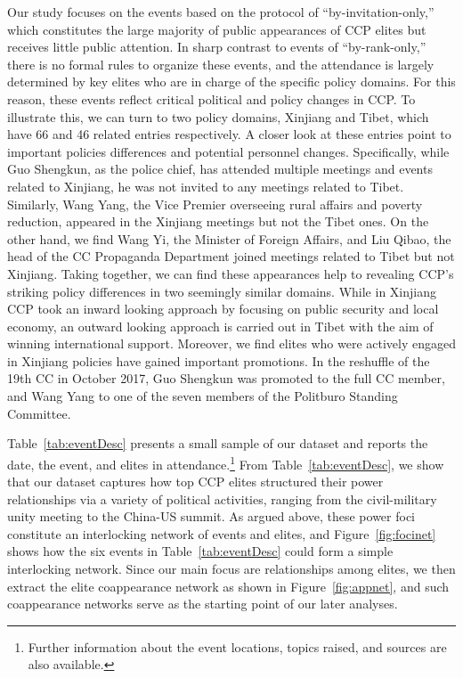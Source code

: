 \documentclass[11pt,english]{article}
\begin{document}
\begin{flushleft}
Our study focuses on the events based on the protocol of “by-invitation-only,” which constitutes the large majority of public appearances of CCP elites but receives little public attention.  In sharp contrast to events of “by-rank-only,” there is no formal rules to organize these events, and the attendance is largely determined by key elites who are in charge of the specific policy domains.  For this reason, these events reflect critical political and policy changes in CCP.  To illustrate this, we can turn to two policy domains, Xinjiang and Tibet, which have 66 and 46 related entries respectively.  A closer look at these entries point to important policies differences and potential personnel changes.  Specifically, while Guo Shengkun, as the police chief, has attended multiple meetings and events related to Xinjiang, he was not invited to any meetings related to Tibet.  Similarly, Wang Yang, the Vice Premier overseeing rural affairs and poverty reduction, appeared in the Xinjiang meetings but not the Tibet ones.  On the other hand, we find Wang Yi, the Minister of Foreign Affairs, and Liu Qibao, the head of the CC Propaganda Department joined meetings related to Tibet but not Xinjiang.  Taking together, we can find these appearances help to revealing CCP’s striking policy differences in two seemingly similar domains.  While in Xinjiang CCP took an inward looking approach by focusing on public security and local economy, an outward looking approach is carried out in Tibet with the aim of winning international support.  Moreover, we find elites who were actively engaged in Xinjiang policies have gained important promotions.  In the reshuffle of the 19th CC in October 2017, Guo Shengkun was promoted to the full CC member, and Wang Yang to one of the seven members of the Politburo Standing Committee.

Table~\ref{tab:eventDesc} presents a small sample of our dataset and reports the date, the event, and elites in attendance.\footnote{Further information about the event locations, topics raised, and sources are also available.} From Table~\ref{tab:eventDesc}, we show that our dataset captures how top CCP elites structured their power relationships via a variety of political activities, ranging from the civil-military unity meeting to the China-US summit. As argued above, these power foci constitute an interlocking network of events and elites, and Figure~\ref{fig:focinet} shows how the six events in Table~\ref{tab:eventDesc} could form a simple interlocking network. Since our main focus are relationships among elites, we then extract the elite coappearance network as shown in Figure~\ref{fig:appnet}, and such coappearance networks serve as the starting point of our later analyses.


\end{flushleft}
\end{document}
